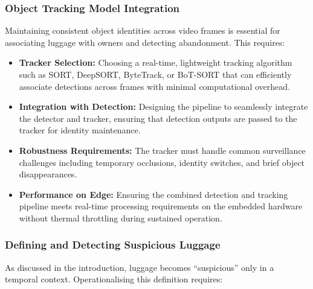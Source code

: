 \subsubsection{Object Tracking Model Integration}

Maintaining consistent object identities across video frames is essential for
associating luggage with owners and detecting abandonment. This requires:

\begin{itemize}
	\item \textbf{Tracker Selection:}\label{req:tracker_selection} Choosing a real-time, lightweight tracking
	      algorithm such as SORT, DeepSORT, ByteTrack, or BoT-SORT that can
	      efficiently associate detections across frames with minimal
	      computational overhead.
	\item \textbf{Integration with Detection:}\label{req:tracker_integration} Designing the pipeline to
	      seamlessly integrate the detector and tracker, ensuring that
	      detection outputs are passed to the tracker for identity maintenance.
	\item \textbf{Robustness Requirements:}\label{req:tracker_robustness} The tracker must handle common
	      surveillance challenges including temporary occlusions, identity
	      switches, and brief object disappearances.
	\item \textbf{Performance on Edge:}\label{req:edge_performance} Ensuring the combined detection and
	      tracking pipeline meets real-time processing requirements on the
	      embedded hardware without thermal throttling during sustained
	      operation.
\end{itemize}

\subsubsection{Defining and Detecting Suspicious Luggage}

As discussed in the introduction, luggage becomes \enquote{suspicious} only in
a temporal context. Operationalising this definition requires:

